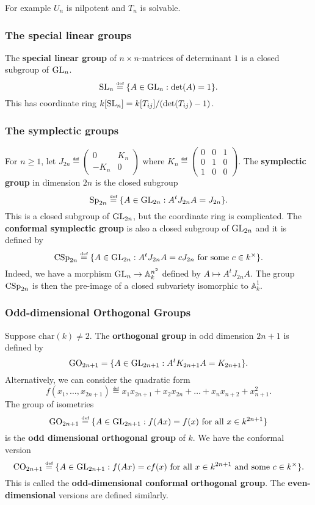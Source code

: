 \documentclass[]{pcmi}
\theoremstyle{plain}
\theoremstyle{definition}
\begin{document}
For example $U_n$ is nilpotent and $T_n$ is solvable. 
\subsubsection{The special linear groups}

The \textbf{special linear group} of $n \times n$-matrices of determinant $1$ is a closed subgroup of $\operatorname{GL}_n$. 
\[
    \operatorname{SL}_n \overset{\textup{\tiny def}}= \{A \in \operatorname{GL}_n : \det(A) = 1\}. 
\]
This has coordinate ring $k[\operatorname{SL}_n] = k[T_{ij}] / (\det (T_{ij}) - 1)$. 

\subsubsection{The symplectic groups}

For $n \geq 1$, let $J_{2n} \eqdef \begin{pmatrix} 0 & K_n \\ -K_n & 0 \end{pmatrix}$ where $K_n \eqdef \begin{pmatrix} 0 & 0 & 1 \\ 0 & 1 & 0 \\ 1 & 0 & 0 \end{pmatrix}$. The \textbf{symplectic group} in dimension $2n$ is the closed subgroup 
\[
    \operatorname{Sp}_{2n} \overset{\textup{\tiny def}}= \{A \in \operatorname{GL}_{2n} : A^t J_{2n} A = J_{2n} \}. 
\]
This is a closed subgroup of $\operatorname{GL}_{2n}$, but the coordinate ring is complicated. The \textbf{conformal symplectic group} is also a closed subgroup of $\operatorname{GL}_{2n}$ and it is defined by 
\[
    \operatorname{CSp}_{2n} \overset{\textup{\tiny def}}= \{A \in \operatorname{GL}_{2n} : A^t J_{2n} A = c J_{2n} \text{ for some } c \in k^\times \}. 
\]
Indeed, we have a morphism $\operatorname{GL}_n \to \mathbb{A}_k^{n^2}$ defined by $A \mapsto A^t J_{2n} A$. The group $\operatorname{CSp}_{2n}$ is then the pre-image of a closed subvariety isomorphic to $\mathbb{A}_k^1$. 

\subsubsection{Odd-dimensional Orthogonal Groups}

Suppose $\text{char}(k) \neq 2$. The \textbf{orthogonal group} in odd dimension $2n+1$ is defined by 
\[
    \operatorname{GO}_{2n+1} = \{A \in \operatorname{GL}_{2n+1} : A^t K_{2n+1} A = K_{2n+1}\}. 
\]
Alternatively, we can consider the quadratic form 
\[
    f(x_1, \ldots, x_{2n+1}) \eqdef x_1 x_{2n+1} + x_2 x_{2n} + \ldots + x_n x_{n+2} + x_{n+1}^2. 
\]
The group of isometries 
\[
    \operatorname{GO}_{2n+1} \overset{\textup{\tiny def}}= \{A \in \operatorname{GL}_{2n+1} : f(Ax) = f(x) \text{ for all } x \in k^{2n+1}\}
\]
is the \textbf{odd dimensional orthogonal group} of $k$. We have the conformal version
\[
    \operatorname{CO}_{2n+1} \overset{\textup{\tiny def}}= \{A \in \operatorname{GL}_{2n+1} : f(Ax) = cf(x) \text{ for all $x \in k^{2n+1}$ and some } c \in k^\times\}. 
\]
This is called the \textbf{odd-dimensional conformal orthogonal group}. The \textbf{even-dimensional} versions are defined similarly. 
\end{document}
